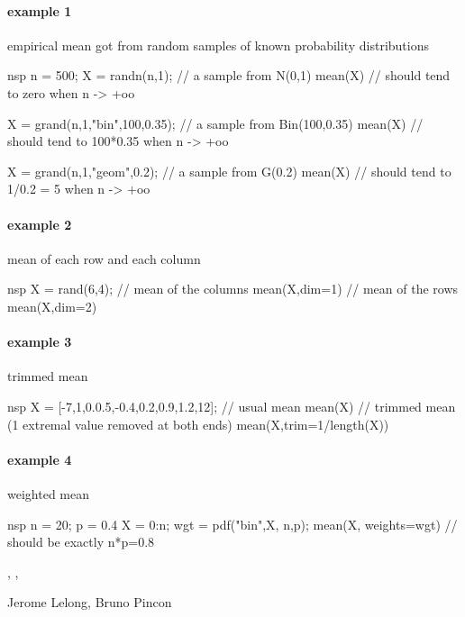 \begin{examples}
\paragraph{example 1} empirical mean got from random samples of known probability distributions 
\begin{mintednsp}{nsp}
n = 500;
X = randn(n,1);  // a sample from N(0,1)
mean(X)   // should tend to zero when n -> +oo

X = grand(n,1,"bin",100,0.35); // a sample from Bin(100,0.35)
mean(X)   // should tend to 100*0.35 when n -> +oo

X = grand(n,1,"geom",0.2); // a sample from G(0.2)
mean(X)   // should tend to 1/0.2 = 5 when n -> +oo
\end{mintednsp}

\paragraph{example 2} mean of each row and each column
\begin{mintednsp}{nsp}
X = rand(6,4);
// mean of the columns
mean(X,dim=1)
// mean of the rows
mean(X,dim=2)
\end{mintednsp}

\paragraph{example 3} trimmed mean
\begin{mintednsp}{nsp}
X = [-7,1,0.0.5,-0.4,0.2,0.9,1.2,12];
// usual mean
mean(X)
// trimmed mean (1 extremal value removed at both ends)
mean(X,trim=1/length(X))
\end{mintednsp}

\paragraph{example 4} weighted mean
\begin{mintednsp}{nsp}
n = 20; p = 0.4
X = 0:n;
wgt = pdf("bin",X, n,p);
mean(X, weights=wgt)  // should be exactly n*p=0.8
\end{mintednsp}


\end{examples}

\begin{manseealso}
   , , 
\end{manseealso}

\begin{authors}
  Jerome Lelong, Bruno Pincon
\end{authors}
